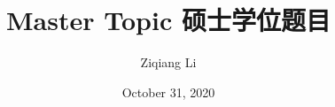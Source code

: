 
\subject{Computer science and Technology} %
\author{Ziqiang Li} %

\date{October 31, 2020} %

\title{Master Topic 硕士学位题目} %

\makecover
\clearpage
\setcounter{page}{1}